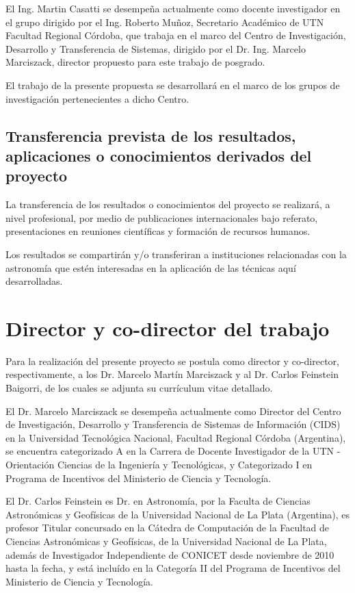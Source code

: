 \documentclass[
	11pt,oneside,a4paper,
	headsepline,footsepline,
	fleqn,
]{memoir}
\begin{document}
El Ing. Martin Casatti se desempeña actualmente como docente investigador en el grupo dirigido por el Ing. Roberto Muñoz, Secretario Académico de UTN Facultad Regional Córdoba, que trabaja en el marco del Centro de Investigación, Desarrollo y Transferencia de Sistemas, dirigido por el Dr. Ing. Marcelo Marciszack, director propuesto para este trabajo de posgrado.

El trabajo de la presente propuesta se desarrollará en el marco de los grupos de investigación pertenecientes a dicho Centro.

\subsection{Transferencia prevista de los resultados, aplicaciones o conocimientos derivados del
	proyecto}

La transferencia de los resultados o conocimientos del proyecto se realizará, a nivel
profesional, por medio de publicaciones internacionales bajo referato, presentaciones en reuniones científicas y formación de recursos humanos.

Los resultados se compartirán y/o transferiran a instituciones relacionadas con la astronomía que estén interesadas en la aplicación de las técnicas aquí desarrolladas.

\section{Director y co-director del trabajo}

Para la realización del presente proyecto se postula como director y co-director, respectivamente, a los Dr. Marcelo Martín Marciszack y al Dr. Carlos Feinstein Baigorri, de los cuales se adjunta su currículum vitae detallado.

El Dr. Marcelo Marciszack se desempeña actualmente como Director del Centro de Investigación, Desarrollo y Transferencia de Sistemas de Información (CIDS) en la Universidad Tecnológica Nacional, Facultad Regional Córdoba (Argentina), se encuentra categorizado A en la Carrera de Docente Investigador de la UTN -
Orientación Ciencias de la Ingeniería y Tecnológicas, y Categorizado I
en Programa de Incentivos del Ministerio de Ciencia y Tecnología.

El Dr. Carlos Feinstein es Dr. en Astronomía, por la Faculta de Ciencias Astronómicas y Geofísicas de la Universidad Nacional de La Plata (Argentina), es profesor Titular concursado en la Cátedra de Computación de la Facultad de Ciencias Astronómicas y Geofísicas, de la Universidad Nacional de La Plata, además de Investigador Independiente de CONICET desde noviembre de 2010 hasta la fecha, y está incluído en la Categoría II del Programa de Incentivos del Ministerio de Ciencia y Tecnología. 
\end{document}
